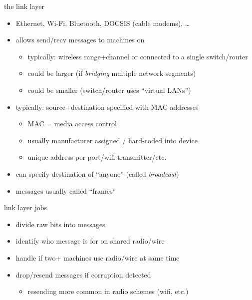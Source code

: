 \begin{frame}{the link layer}
\begin{itemize}
\item Ethernet, Wi-Fi, Bluetooth, DOCSIS (cable modems), \ldots
\vspace{.5cm}
\item allows send/recv messages to machines on 
    \begin{itemize}
    \item typically: wireless range+channel or connected to a single switch/router
    \item could be larger (if \textit{bridging} multiple network segments)
    \item could be smaller (switch/router uses ``virtual LANs'')
    \end{itemize}
\item typically: source+destination specified with MAC addresses
    \begin{itemize}
    \item MAC = media access control
    \item usually manufacturer assigned / hard-coded into device
    \item unique address per port/wifi transmitter/etc.
    \end{itemize}
\item can specify destination of ``anyone'' (called \textit{broadcast})
\item messages usually called ``frames''
\end{itemize}
\end{frame}

\begin{frame}{link layer jobs}
    \begin{itemize}
    \item divide raw bits into messages
    \item identify who message is for on shared radio/wire
    \item handle if two+ machines use radio/wire at same time
    \item drop/resend messages if corruption detected
        \begin{itemize}
        \item resending more common in radio schemes (wifi, etc.)
        \end{itemize}
    \end{itemize}
\end{frame}

